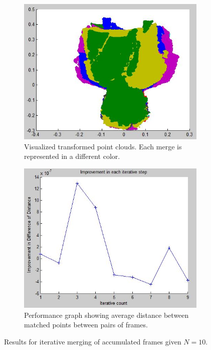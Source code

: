 \documentclass[11pt]{article}
\begin{document}
\begin{figure}[h] \centering
	\begin{subfigure}{.5\textwidth} 
		\includegraphics[width=.9\textwidth]{img/iterative_10.jpg}
		\caption{Visualized transformed point clouds. Each merge is represented in a different color.}
		\label{fig:iterative_10}
	\end{subfigure}%
	\begin{subfigure}{.5\textwidth} 
		\includegraphics[width=.9\textwidth]{img/iterative_10_performance.jpg}
		\caption{Performance graph showing average distance between matched points between pairs of frames.}
		\label{fig:iterative_10_performance}
	\end{subfigure}
	\caption{Results for iterative merging of accumulated frames given $N = 10$.}
\end{figure}
\end{document}
